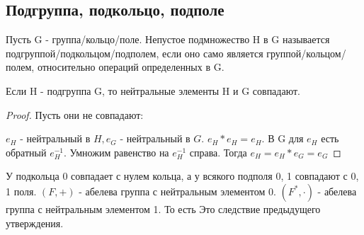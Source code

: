 \subsection{Подгруппа, подкольцо, подполе}
\begin{definition}
	Пусть G - группа/кольцо/поле. Непустое подмножество H в G называется подгруппой/подкольцом/подполем, если оно само является группой/кольцом/полем, относительно операций определенных в G.
\end{definition}
\begin{proposition}
	Если H - подгруппа G, то нейтральные элементы H и G совпадают.
\end{proposition}
\begin{proof}
	Пусть они не совпадают: 
	
	\(e_H \text{ - нейтральный в }H, e_G \text{ - нейтральный в }G\). \(e_H*e_H = e_H\). В G для \(e_H\) есть обратный \(e_H^{-1}\). Умножим равенство на \(e_H^{-1}\) справа. Тогда \(e_H = e_H*e_G = e_G\)
\end{proof}
\begin{corollary}
	У подкольца 0 совпадает с нулем кольца, а у всякого подполя 0, 1 совпадают с 0, 1 поля. \newline
	\((F, +)\) - абелева группа с нейтральным элементом 0. \((F^*, \cdot)\) - абелева группа с нейтральным элементом 1. То есть Это следствие предыдущего утверждения.
\end{corollary}

